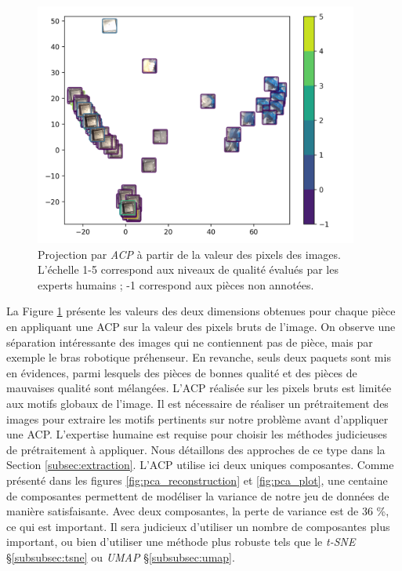 \begin{figure}[hbtp]
	\centering
	\includegraphics[width=0.95\textwidth,height=\textheight,keepaspectratio]{../Chap4/Figures/visualize_PCA_pixel_space.png}
	\caption{Projection par \textit{ACP} à partir de la valeur des pixels des images. L'échelle 1-5 correspond aux niveaux de qualité évalués par les experts humains ; -1 correspond aux pièces non annotées.}
	\label{fig:ACP}
\end{figure}

La Figure \ref{fig:ACP} présente les valeurs des deux dimensions obtenues pour chaque pièce en appliquant une ACP sur la valeur des pixels bruts de l'image.
On observe une séparation intéressante des images qui ne contiennent pas de pièce, mais par exemple le bras robotique préhenseur.
En revanche, seuls deux paquets sont mis en évidences, parmi lesquels des pièces de bonnes qualité et des pièces de mauvaises qualité sont mélangées.
L'ACP réalisée sur les pixels bruts est limitée aux motifs globaux de l'image.
Il est nécessaire de réaliser un prétraitement des images pour extraire les motifs pertinents sur notre problème avant d'appliquer une ACP.
L'expertise humaine est requise pour choisir les méthodes judicieuses de prétraitement à appliquer.
Nous détaillons des approches de ce type dans la Section \ref{subsec:extraction}.
L'ACP utilise ici deux uniques composantes.
Comme présenté dans les figures \ref{fig:pca_reconstruction} et \ref{fig:pca_plot}, une centaine de composantes permettent de modéliser la variance de notre jeu de données de manière satisfaisante.
Avec deux composantes, la perte de variance est de 36 \%, ce qui est important.
Il sera judicieux d'utiliser un nombre de composantes plus important, ou bien d'utiliser une méthode plus robuste tels que le \textit{t-SNE} §\ref{subsubsec:tsne} ou \textit{UMAP} §\ref{subsubsec:umap}.

